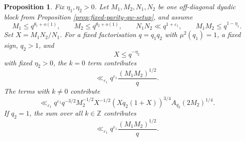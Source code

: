 \documentclass[12pt, a4paper]{amsart}
\numberwithin{equation}{section}
\renewcommand{\le}{\leqslant}
\theoremstyle{plain}
\newtheorem{prop}[lem]{Proposition}
\begin{document}
\begin{prop}\label{prop:qw-preinsertion}
Fix $\eta_1,\eta_2>0$. Let $M_1,M_2,N_1,N_2$ be one off-diagonal dyadic block from Proposition \ref{prop:fixed-parity-qw-setup}, and assume
$$
M_1\le q^{\theta_1+o(1)},\qquad
M_2\le q^{\theta_2+o(1)},\qquad
N_1N_2\ll q^{1+\varepsilon_1},\qquad
M_1M_2\le q^{1-\eta_1}.
$$
Set $X=M_1N_2/N_1$. For a fixed factorisation $q=q_1q_2$ with $\mu^2(q_1)=1$, a fixed sign, $q_2>1$, and
$$
X\le q^{-\eta_2}
$$
with fixed $\eta_2>0$, the $k=0$ term contributes
$$
\ll_{\varepsilon_1} q^{\varepsilon_1}\frac{(M_1M_2)^{1/2}}{q}.
$$
The terms with $k\ne0$ contribute
$$
\ll_{\varepsilon_1}
q^{\varepsilon_1} q^{-3/2}M_2^{-1/2}X^{-1/2}
(Xq_2(1+X))^{3/4}A_{q_2}(2M_2)^{1/4}.
$$
If $q_2=1$, the sum over all $k\in\mathbb Z$ contributes
$$
\ll_{\varepsilon_1} q^{\varepsilon_1}\frac{(M_1M_2)^{1/2}}{q}.
$$
\end{prop}
\end{document}

